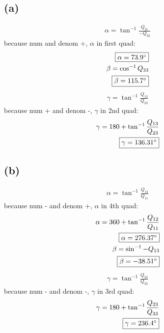 \documentclass[12 pt]{article}
\begin{document}
\subsection*{(a)}
\begin{align*}
    \alpha= \tan^{-1}{\frac{Q_{31}}{-Q_{32}}}
\end{align*}
because num and denom +, $\alpha$ in first quad:
\begin{align*}
    \fbox{$\alpha=73.9^{\circ}$} \\
    \beta=\cos^{-1}{Q_{33}} \\
    \fbox{$\beta=115.7^{\circ}$}
\end{align*}
\begin{align*}
    \gamma = \tan^{-1}{\frac{Q_{13}}{Q_{23}}}
\end{align*}
because num + and denom -, $\gamma$ in 2nd quad:
\begin{align*}
    \gamma = 180+\tan^{-1}{\frac{Q_{13}}{Q_{23}}} \\
    \fbox{$\gamma=136.31^{\circ}$}
\end{align*}

\subsection*{(b)}
\begin{align*}
    \alpha=\tan^{-1}{\frac{Q_{12}}{Q_{11}}}
\end{align*}
because num - and denom +, $\alpha$ in 4th quad:
\begin{align*}
    \alpha = 360+\tan^{-1}{\frac{Q_{12}}{Q_{11}}} \\
    \fbox{$\alpha=276.37^{\circ}$} \\
    \beta=\sin^{-1}{-Q_{13}} \\
    \fbox{$\beta=-38.51^{\circ}$}
\end{align*}
\begin{align*}
    \gamma=\tan^{-1}{\frac{Q_{23}}{Q_{33}}}
\end{align*}
because num -  and denom -, $\gamma$ in 3rd quad:
\begin{align*}
    \gamma=180+\tan^{-1}{\frac{Q_{23}}{Q_{33}}} \\
    \fbox{$\gamma=236.4^{\circ}$}
\end{align*}
\end{document}
